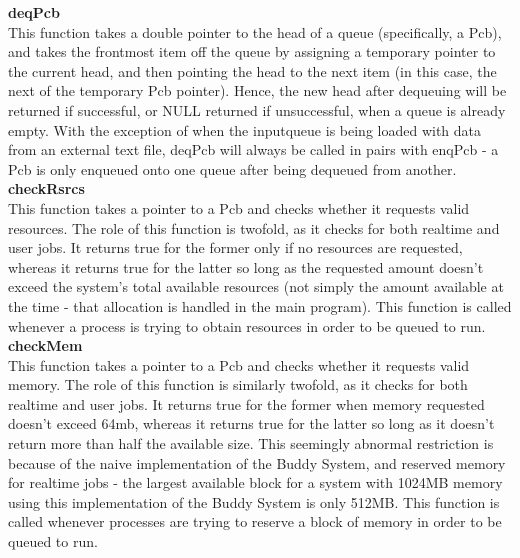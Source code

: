 \documentclass[11pt]{article}
\begin{document}
\textbf{deqPcb}\\
This function takes a double pointer to the head of a queue (specifically, a Pcb), and takes the frontmost item off the queue by assigning a temporary pointer to the current head, and then pointing the head to the next item (in this case, the next of the temporary Pcb pointer). Hence, the new head after dequeuing will be returned if successful, or NULL returned if unsuccessful, when a queue is already empty. With the exception of when the inputqueue is being loaded with data from an external text file, deqPcb will always be called in pairs with enqPcb - a Pcb is only enqueued onto one queue after being dequeued from another.\\

\textbf{checkRsrcs}\\
This function takes a pointer to a Pcb and checks whether it requests valid resources. The role of this function is twofold, as it checks for both realtime and user jobs. It returns true for the former only if no resources are requested, whereas it returns true for the latter so long as the requested amount doesn't exceed the system's total available resources (not simply the amount available at the time - that allocation is handled in the main program). This function is called whenever a process is trying to obtain resources in order to be queued to run.
\\

\textbf{checkMem}\\
This function takes a pointer to a Pcb and checks whether it requests valid memory. The role of this function is similarly twofold, as it checks for both realtime and user jobs. It returns true for the former when memory requested doesn't exceed 64mb, whereas it returns true for the latter so long as it doesn't return more than half the available size. This seemingly abnormal restriction is because of the naive implementation of the Buddy System, and reserved memory for realtime jobs - the largest available block for a system with 1024MB memory using this implementation of the Buddy System is only 512MB. This function is called whenever processes are trying to reserve a block of memory in order to be queued to run.\\
\end{document}
